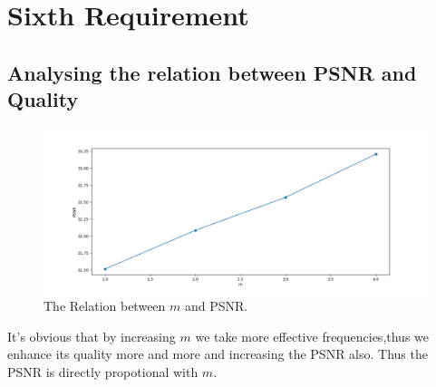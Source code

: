 \chapter{Sixth Requirement}
\section{Analysing the relation between PSNR and Quality}
\vspace{40pt}
\begin{figure}[h]
    \centering
    \includegraphics[width=1\textwidth]{../PSNR_plot.png}
    \caption{The Relation between $m$ and PSNR.}
    \label{fig:PSNR_m_plot}
\end{figure}


\noindent It's obvious that by increasing $m$ we take more effective frequencies,thus we enhance its quality more and more and increasing the PSNR also.
Thus the PSNR is directly propotional with $m$.